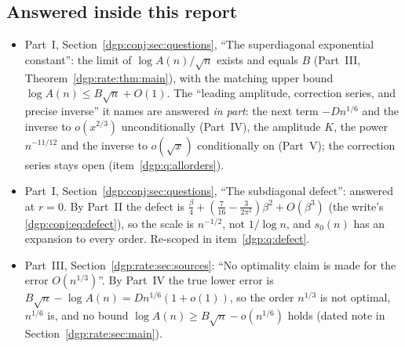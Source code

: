 \documentclass[11pt,letterpaper]{article}
\numberwithin{equation}{section}
\theoremstyle{remark}\newtheorem{remark}[theorem]{Remark}
\begin{document}
\subsection*{Answered inside this report}
\begin{itemize}
\item Part~I, Section~\ref{dgp:conj:sec:questions}, ``The superdiagonal exponential constant'': the limit of $\log A(n)/\sqrt n$ exists and equals $B$ (Part~III, Theorem~\ref{dgp:rate:thm:main}), with the matching upper bound $\log A(n)\le B\sqrt n+O(1)$. The ``leading amplitude, correction series, and precise inverse'' it names are answered \emph{in part}: the next term $-Dn^{1/6}$ and the inverse to $o(x^{2/3})$ unconditionally (Part~IV), the amplitude $K$, the power $n^{-11/12}$ and the inverse to $o(\sqrt x)$ conditionally on \cite{li} (Part~V); the correction series stays open (item~\ref{dgp:q:allorders}).
\item Part~I, Section~\ref{dgp:conj:sec:questions}, ``The subdiagonal defect'': answered at $r=0$. By Part~II the defect is $\frac\beta4+(\frac7{16}-\frac3{2\pi^2})\beta^2+O(\beta^3)$ (the write's \eqref{dgp:conj:eq:defect}), so the scale is $n^{-1/2}$, not $1/\log n$, and $s_0(n)$ has an expansion to every order. Re-scoped in item~\ref{dgp:q:defect}.
\item Part~III, Section~\ref{dgp:rate:sec:sources}: ``No optimality claim is made for the error $O(n^{1/3})$''. By Part~IV the true lower error is $B\sqrt n-\log A(n)=Dn^{1/6}(1+o(1))$, so the order $n^{1/3}$ is not optimal, $n^{1/6}$ is, and no bound $\log A(n)\ge B\sqrt n-o(n^{1/6})$ holds (dated note in Section~\ref{dgp:rate:sec:main}).
\end{itemize}
\end{document}
